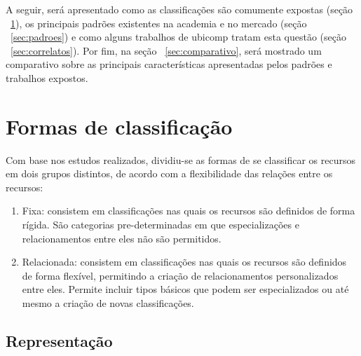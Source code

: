 A seguir, será apresentado como as classificações são comumente expostas (seção ~\ref{sec:formasDeClass}), os principais padrões existentes na academia e no mercado (seção ~\ref{sec:padroes}) e como alguns trabalhos de ubicomp tratam esta questão (seção ~\ref{sec:correlatos}). Por fim, na seção ~\ref{sec:comparativo}, será mostrado um comparativo sobre as principais características apresentadas pelos padrões e trabalhos expostos.

\section{Formas de classificação}
\label{sec:formasDeClass}

Com base nos estudos realizados, dividiu-se as formas de se classificar os recursos em dois grupos distintos, de acordo com a flexibilidade das relações entre os recursos:

\begin{enumerate}
	\item Fixa: consistem em classificações nas quais os recursos são definidos de forma rígida. São categorias pre-determinadas em que especializações e relacionamentos entre eles não são permitidos.

	\item Relacionada: consistem em classificações nas quais os recursos são definidos de forma flexível, permitindo a criação de relacionamentos personalizados entre eles. Permite incluir tipos básicos que podem ser especializados ou até mesmo a criação de novas classificações.
\end{enumerate}

\subsection{Representação}

